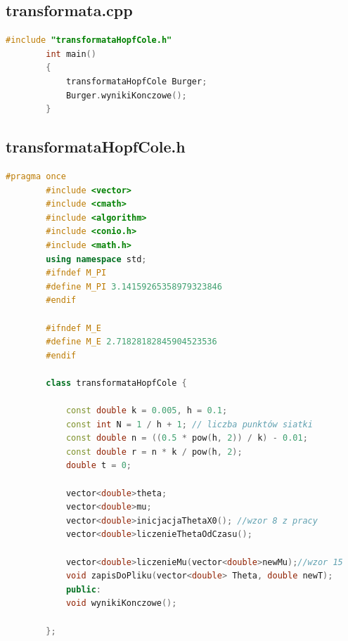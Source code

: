 \documentclass[a4paper,12pt]{article}
\begin{document}
	\subsection{transformata.cpp}
	\begin{lstlisting}[caption={transformata.cpp},label={transformataCalyKod}, language=C++]
		#include "transformataHopfCole.h"
		int main()
		{
			transformataHopfCole Burger;
			Burger.wynikiKonczowe();
		}
	\end{lstlisting}
	\subsection{transformataHopfCole.h}
	\begin{lstlisting}[caption={transformataHopfCole.h},label={transformataHopfCole.hCalyKod}, language=C++]
		#pragma once
		#include <vector>
		#include <cmath>
		#include <algorithm>
		#include <conio.h>
		#include <math.h>
		using namespace std;
		#ifndef M_PI
		#define M_PI 3.14159265358979323846
		#endif
		
		#ifndef M_E
		#define M_E 2.71828182845904523536
		#endif
		
		class transformataHopfCole {
			
			const double k = 0.005, h = 0.1;
   			const int N = 1 / h + 1; // liczba punktów siatki
			const double n = ((0.5 * pow(h, 2)) / k) - 0.01;
			const double r = n * k / pow(h, 2);
			double t = 0;
			
			vector<double>theta;
			vector<double>mu;
			vector<double>inicjacjaThetaX0(); //wzor 8 z pracy
			vector<double>liczenieThetaOdCzasu();
			
			vector<double>liczenieMu(vector<double>newMu);//wzor 15
			void zapisDoPliku(vector<double> Theta, double newT);
			public:
			void wynikiKonczowe();
			
		};
	\end{lstlisting}
\end{document}
